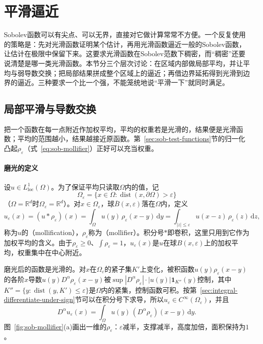 
\section{平滑逼近}
\label{sec:sob-smoothing}

Sobolev函数可以有尖点、可以无界，直接对它做计算常常不方便。一个反复使用的策略是：先对光滑函数证明某个估计，再用光滑函数逼近一般的Sobolev函数，让估计在极限中保留下来。这要求光滑函数在Sobolev范数下稠密，而“稠密”还要说清楚是哪一类光滑函数。本节分三个层次讨论：在区域内部做局部平均，并让平均与弱导数交换；把局部结果拼成整个区域上的逼近；再借边界延拓得到光滑到边界的逼近。三种要求一个比一个强，不能笼统地说“平滑一下”就同时满足。

\subsection{局部平滑与导数交换}
\label{sec:sob-mollification}

把一个函数在每一点附近作加权平均，平均的权重若是光滑的，结果便是光滑函数；平均的范围越小，结果越接近原函数。第~\ref{sec:sob-test-functions}节的归一化凸起$\rho_\varepsilon$（式~\eqref{eq:sob-mollifier}）正好可以充当权重。

\paragraph{磨光的定义}
设$u\in L^1_{\mathrm{loc}}(\Omega)$。为了保证平均只读取$\Omega$内的值，记
\[
 \Omega_\varepsilon=\{x\in\Omega:\operatorname{dist}(x,\partial\Omega)>\varepsilon\}
\]
（$\Omega=\mathbb R^d$时$\Omega_\varepsilon=\mathbb R^d$）。对$x\in\Omega_\varepsilon$，球$\overline B(x,\varepsilon)$落在$\Omega$内，定义
\begin{equation}
 u_\varepsilon(x)=(u*\rho_\varepsilon)(x)=\int_\Omega u(y)\,\rho_\varepsilon(x-y)\,\mathrm dy=\int_{|z|\le\varepsilon}u(x-z)\,\rho_\varepsilon(z)\,\mathrm dz ,
 \label{eq:sob-mollification}
\end{equation}
称为$u$的（mollification），$\rho_\varepsilon$称为（mollifier）。积分号$*$即卷积，这里只用到它作为加权平均的含义。由于$\rho_\varepsilon\ge0$、$\int\rho_\varepsilon=1$，$u_\varepsilon(x)$是$u$在球$B(x,\varepsilon)$上的加权平均，权重集中在中心附近。

磨光后的函数是光滑的。对$x$在$\Omega_\varepsilon$的紧子集$K'$上变化，被积函数$u(y)\rho_\varepsilon(x-y)$的各阶$x$导数$u(y)D^\alpha\rho_\varepsilon(x-y)$被$\sup|D^\alpha\rho_\varepsilon|\cdot|u(y)|\mathbf 1_{K''}(y)$控制，其中$K''=\{y:\operatorname{dist}(y,K')\le\varepsilon\}$是$\Omega$内的紧集，控制函数可积。按第~\ref{sec:integral-differentiate-under-sign}节可以在积分号下求导，所以$u_\varepsilon\in C^\infty(\Omega_\varepsilon)$，并且
\begin{equation}
 D^\alpha u_\varepsilon(x)=\int_\Omega u(y)\,(D^\alpha\rho_\varepsilon)(x-y)\,\mathrm dy .
 \label{eq:sob-mollifier-derivative}
\end{equation}
图~\ref{fig:sob-mollifier}(a)画出一维的$\rho_\varepsilon$：$\varepsilon$减半，支撑减半，高度加倍，面积保持为$1$。

